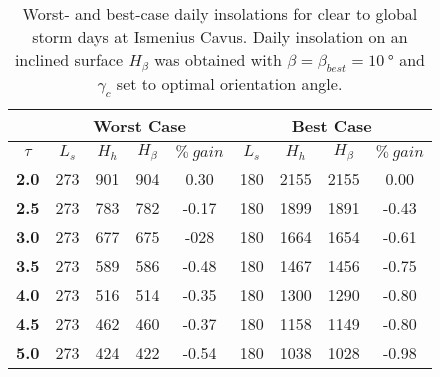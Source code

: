\begin{table}[h]
\footnotesize
\centering
\caption[Worst- and best-case daily insolations for global storm days at Ismenius Cavus]
{Worst- and best-case daily insolations for clear to global storm days at Ismenius Cavus. Daily insolation on an inclined surface $H_{\beta}$ was obtained with $\beta = \beta_{best} = \SI{10}{\degree}$ and $\gamma_{c}$ set to optimal orientation angle.}
\label{tab:insolation-ismenius-cavus-global-storm-days}
\begin{tabular}{c|c|c|c|c|c|c|c|c|}
\cline{2-9}
\multicolumn{1}{l|}{} & \multicolumn{4}{c|}{\textbf{Worst Case}} & \multicolumn{4}{c|}{\textbf{Best Case}} \\ \hline
\multicolumn{1}{|c|}{$\tau$} & $L_{s}$ & $H_{h}$ & $H_{\beta}$ & $\%\:gain$ & $L_{s}$ & $H_{h}$ & $H_{\beta}$ & $\%\:gain$ \\ \hline
\multicolumn{1}{|c|}{\textbf{2.0}} & 273 & 901 & 904 & 0.30 & 180 & 2155 & 2155 & 0.00 \\ \hline
\multicolumn{1}{|c|}{\textbf{2.5}} & 273 & 783 & 782 & -0.17 & 180 & 1899 & 1891 & -0.43 \\ \hline
\multicolumn{1}{|c|}{\textbf{3.0}} & 273 & 677 & 675 & -028 & 180 & 1664 & 1654 & -0.61 \\ \hline
\multicolumn{1}{|c|}{\textbf{3.5}} & 273 & 589 & 586 & -0.48 & 180 & 1467 & 1456 & -0.75 \\ \hline
\multicolumn{1}{|c|}{\textbf{4.0}} & 273 & 516 & 514 & -0.35 & 180 & 1300 & 1290 & -0.80 \\ \hline
\multicolumn{1}{|c|}{\textbf{4.5}} & 273 & 462 & 460 & -0.37 & 180 & 1158 & 1149 & -0.80 \\ \hline
\multicolumn{1}{|c|}{\textbf{5.0}} & 273 & 424 & 422 & -0.54 & 180 & 1038 & 1028 & -0.98 \\ \hline
\end{tabular}
\end{table}
